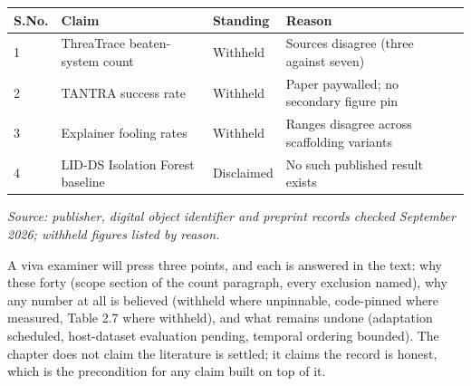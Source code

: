 \begin{center}
\begin{tabular}{llll}
\toprule

S.No. & Claim & Standing & Reason \\

\midrule

1 & ThreaTrace beaten-system count \cite{k22} & Withheld & Sources disagree (three against seven) \\

2 & TANTRA success rate \cite{k32} & Withheld & Paper paywalled; no secondary figure pin \\

3 & Explainer fooling rates \cite{k37} & Withheld & Ranges disagree across scaffolding variants \\

4 & LID-DS Isolation Forest baseline & Disclaimed & No such published result exists \\

\bottomrule
\end{tabular}
\end{center}

{\small\textit{Source: publisher, digital object identifier and preprint records checked September 2026; withheld figures listed by reason.}}

A viva examiner will press three points, and each is answered in the text: why these forty (scope section of the count paragraph, every exclusion named), why any number at all is believed (withheld where unpinnable, code-pinned where measured, Table 2.7 where withheld), and what remains undone (adaptation scheduled, host-dataset evaluation pending, temporal ordering bounded). The chapter does not claim the literature is settled; it claims the record is honest, which is the precondition for any claim built on top of it.

